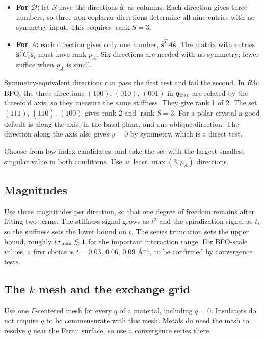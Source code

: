 \documentclass[11pt,a4paper]{article}
\numberwithin{equation}{section}
\newcommand{\vct}[1]{\bm{#1}}
\newcommand{\qh}{\vct q}
\newcommand{\sh}{\hat{\vct s}}
\newcommand{\Dt}{\mathcal D}
\begin{document}
\begin{itemize}
\item \textbf{For $\Dt$:} let $S$ have the directions $\sh_i$ as columns. Each
direction gives three numbers, so three non-coplanar directions determine all
nine entries with no symmetry input. This requires $\operatorname{rank}S=3$.
\item \textbf{For $A$:} each direction gives only one number,
$\sh^TA\sh$. The matrix with entries $\sh_i^TC_\ell\sh_i$ must have rank $p_A$.
Six directions are needed with no symmetry; fewer suffice when $p_A$ is small.
\end{itemize}

Symmetry-equivalent directions can pass the first test and fail the second. In
$R3c$ BFO, the three directions $(100)$, $(010)$, $(001)$ in $\qh_{\rm frac}$ are
related by the threefold axis, so they measure the same stiffness. They give rank
1 of 2. The set $(111)$, $(1\bar10)$, $(100)$ gives rank 2 and $\operatorname{rank}S=3$.
For a polar crystal a good default is along the axis, in the basal plane, and
one oblique direction. The direction along the axis also gives $y=0$ by symmetry,
which is a direct test.

Choose from low-index candidates, and take the set with the largest smallest
singular value in both conditions. Use at least $\max(3,p_A)$ directions.

\subsection{Magnitudes}

Use three magnitudes per direction, so that one degree of freedom remains after
fitting two terms. The stiffness signal grows as $t^2$ and the spiralization
signal as $t$, so the stiffness sets the lower bound on $t$. The series truncation
sets the upper bound, roughly $t\,r_{\rm max}\lesssim1$ for the important
interaction range. For BFO-scale values, a first choice is
$t=0.03,\,0.06,\,0.09$ \AA$^{-1}$, to be confirmed by convergence tests.

\subsection{The \(k\) mesh and the exchange grid}

Use one $\Gamma$-centered mesh for every $q$ of a material, including $q=0$. Insulators
do not require $q$ to be commensurate with this mesh. Metals do need the mesh to
resolve $q$ near the Fermi surface, so use a convergence series there.
\end{document}
